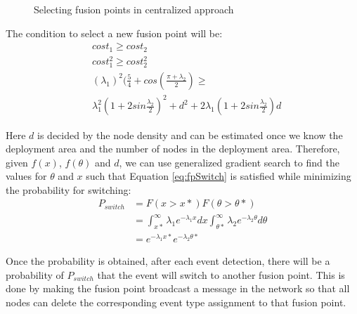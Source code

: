\begin{figure}
\centering
{}
\caption{Selecting fusion points in centralized approach}
\label{fig:centralizedTED}
\end{figure}

The condition to select a new fusion point will be:
\begin{align}
&cost_1\geq cost_2\nonumber \\
&cost_1^2\geq cost_2^2\nonumber \\
&({\lambda}_1)^2(\frac{5}{4}+cos(\frac{\pi+{\lambda}_2}{2})\geq\nonumber \\ &{\lambda}_1^2(1+2sin\frac{{\lambda}_2}{2})^2+d^2+2{\lambda}_1(1+2sin\frac{{\lambda}_2}{2})d
\label{eq:fpSwitch}
\end{align}

Here \(d\) is decided by the node density and can be estimated once we know the deployment area and the number of nodes in the deployment area. Therefore, given \(f(x)\), \(f(\theta)\) and \(d\), we can use generalized gradient search to find the values for \(\theta\) and \(x\) such that Equation \ref{eq:fpSwitch} is satisfied while minimizing the probability for switching:
\begin{align*}
P_{switch}&=F(x>x*)F(\theta>\theta *)\\
&=\int_{x*}^{\infty}{\lambda}_1e^{-{\lambda}_1x}dx\int_{\theta *}^{\infty}{\lambda}_2e^{-{\lambda}_2\theta}d\theta\\
&=e^{-{\lambda}_1x*}e^{-{\lambda}_2\theta *}
\end{align*}

Once the probability is obtained, after each event detection, there will be a probability of \(P_{switch}\) that the event will switch to another fusion point. This is done by making the fusion point broadcast a message in the network so that all nodes can delete the corresponding event type assignment to that fusion point.